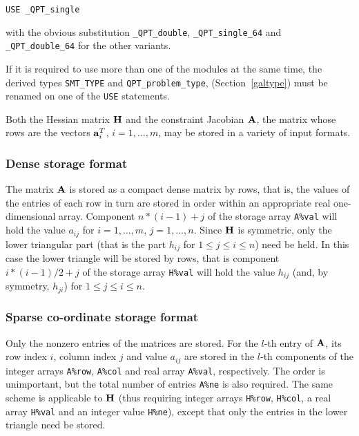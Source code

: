 \documentclass{galahad}
\newcommand{\packagename}{QPT}
\newcommand{\fullpackagename}{\libraryname\_\packagename}
\begin{document}
\hspace{8mm} {\tt USE \fullpackagename\_single}

\medskip
\noindent
with the obvious substitution {\tt \fullpackagename\_double},
{\tt \fullpackagename\_single\_64} and 
{\tt \fullpackagename\_double\_64} for the other variants.

\noindent
If it is required to use more than one of the modules at the same time, 
the derived types
{\tt SMT\_TYPE}
and
{\tt QPT\_problem\_type},
(Section~\ref{galtype})
must be renamed on one of the {\tt USE} statements.


\galmatrix
Both the Hessian matrix ${\mathbf{H}}$ and
the constraint Jacobian ${\mathbf{A}}$, the matrix
whose rows are the vectors ${\mathbf{a}}_{i}^{T}$, $i = 1, \ldots , m$,
may be stored in a variety of input formats.

\subsubsection{Dense storage format}\label{dense}
The matrix ${\mathbf{A}}$ is stored as a compact
dense matrix by rows, that is, the values of the entries of each row in turn are
stored in order within an appropriate real one-dimensional array.
Component $n \ast (i-1) + j$ of the storage array {\tt A\%val} will hold the
value $a_{ij}$ for $i = 1, \ldots , m$, $j = 1, \ldots , n$.
Since ${\mathbf{H}}$ is symmetric, only the lower triangular part (that is the part
$h_{ij}$ for $1 \leq j \leq i \leq n$) need be held. In this case
the lower triangle will be stored by rows, that is
component $i \ast (i-1)/2 + j$ of the storage array {\tt H\%val}
will hold the value $h_{ij}$ (and, by symmetry, $h_{ji}$)
for $1 \leq j \leq i \leq n$.

\subsubsection{Sparse co-ordinate storage format}\label{coordinate}
Only the nonzero entries of the matrices are stored. For the
$l$-th entry of ${\mathbf{A}}$, its row index $i$, column index $j$
and value $a_{ij}$
are stored in the $l$-th components of the integer arrays {\tt A\%row},
{\tt A\%col} and real array {\tt A\%val}, respectively.
The order is unimportant, but the total
number of entries {\tt A\%ne} is also required.
The same scheme is applicable to
${\mathbf{H}}$ (thus requiring integer arrays {\tt H\%row}, {\tt H\%col}, a real array
{\tt H\%val} and an integer value {\tt H\%ne}),
except that only the entries in the lower triangle need be stored.
\end{document}
